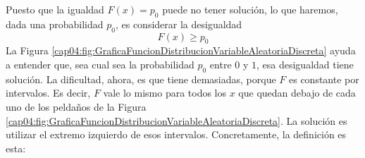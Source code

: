 Puesto que la igualdad $F(x)=p_0$ puede no tener solución, lo que haremos, dada una probabilidad  $p_0$, es considerar la desigualdad
\[F(x)\geq p_0\]
La Figura \ref{cap04:fig:GraficaFuncionDistribucionVariableAleatoriaDiscreta} ayuda a entender que, sea cual sea la probabilidad $p_0$ entre $0$ y $1$, esa desigualdad tiene solución. La dificultad, ahora, es que tiene demasiadas, porque $F$ es constante por intervalos. Es decir, $F$ vale lo mismo para todos los $x$ que quedan debajo de cada uno de los peldaños de la Figura \ref{cap04:fig:GraficaFuncionDistribucionVariableAleatoriaDiscreta}. La solución es utilizar el extremo izquierdo de esos intervalos. Concretamente, la definición es esta:
    \begin{center}
    \end{center}
